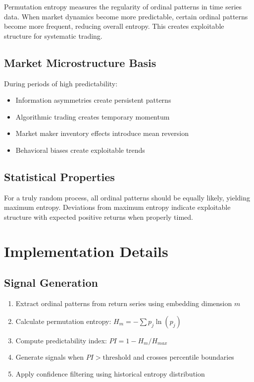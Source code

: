 \documentclass{article}
\begin{document}
Permutation entropy measures the regularity of ordinal patterns in time series data. When market dynamics become more predictable, certain ordinal patterns become more frequent, reducing overall entropy. This creates exploitable structure for systematic trading.

\subsection{Market Microstructure Basis}

During periods of high predictability:
\begin{itemize}
\item Information asymmetries create persistent patterns
\item Algorithmic trading creates temporary momentum
\item Market maker inventory effects introduce mean reversion
\item Behavioral biases create exploitable trends
\end{itemize}

\subsection{Statistical Properties}

For a truly random process, all ordinal patterns should be equally likely, yielding maximum entropy. Deviations from maximum entropy indicate exploitable structure with expected positive returns when properly timed.

\section{Implementation Details}

\subsection{Signal Generation}

\begin{enumerate}
\item Extract ordinal patterns from return series using embedding dimension $m$
\item Calculate permutation entropy: $H_m = -\sum p_j \ln(p_j)$
\item Compute predictability index: $PI = 1 - H_m/H_{max}$
\item Generate signals when $PI > \text{threshold}$ and crosses percentile boundaries
\item Apply confidence filtering using historical entropy distribution
\end{enumerate}
\end{document}
